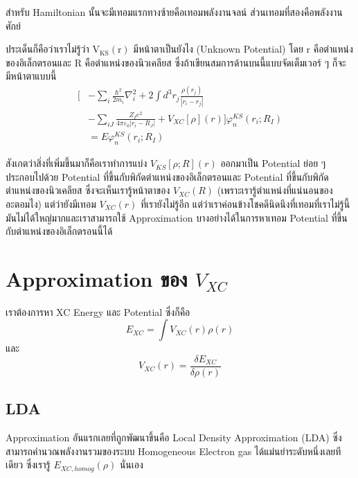 สำหรับ Hamiltonian นั้นจะมีเทอมแรกทางซ้ายคือเทอมพลังงานจลน์ ส่วนเทอมที่สองคือพลังงานศักย์

ประเด็นก็คือว่าเราไม่รู้ว่า $\mathrm{V}_{\mathrm{KS}}(\mathrm{r})$ มีหน้าตาเป็นยังไง (Unknown Potential) โดย $\mathrm{r}$ คือตำแหน่งของอิเล็กตรอนและ $\mathrm{R}$ คือตำแหน่งของนิวเคลียส ซึ่งถ้าเขียนสมการด้านบนนี้แบบจัดเต็มเวอร์ ๆ ก็จะมีหน้าตาแบบนี้
%
\begin{align}
    \biggl[ & -\sum_i \frac{\hbar^2}{2 m_i} \nabla_i^2+2 \int d^3 r_j
        \frac{\rho\left(r_j\right)}{\left|r_i-r_j\right|} \nonumber \\
        & -\sum_{i J} \frac{Z_I e^2}{4 \pi \varepsilon_0\left|r_i-R_J\right|}  
        + V_{X C}[\rho](r) \biggr] \varphi_n^{K S}\left(r_i ; R_I\right) \nonumber \\
    & = E \varphi_n^{K S}\left(r_i ; R_I\right)
\end{align}

สังเกตว่าสิ่งที่เพิ่มขึ้นมาก็คือเราทำการแบ่ง $V_{K S}[\rho ; R](r)$ ออกมาเป็น Potential ย่อย ๆ ประกอบไปด้วย Potential ที่ขึ้นกับพิกัดตำแหน่งของอิเล็กตรอนและ Potential ที่ขึ้นกับพิกัดตำแหน่งของนิวเคลียส ซึ่งจะเห็นเรารู้หน้าตาของ $V_{X C}(R)$ (เพราะเรารู้ตำแหน่งที่แน่นอนของอะตอมไง) แต่ว่ายังมีเทอม $V_{X C}(r)$ ที่เรายังไม่รู้อีก แต่ว่าเราค่อนข้างโชคดีนิดนึงที่เทอมที่เราไม่รู้นี้มันไม่ได้ใหญ่มากและเราสามารถใช้ Approximation บางอย่างได้ในการหาเทอม Potential ที่ขึ้นกับตำแหน่งของอิเล็กตรอนนี้ได้

\section{Approximation ของ $V_{X C}$}

เราต้องการหา XC Energy และ Potential ซึ่งก็คือ
%
\begin{equation}
    E_{XC} = \int V_{X C}(r) \rho(r)
\end{equation}
%
\noindent และ
%
\begin{equation}
    V_{X C}(r) = \frac{\delta E_{X C}}{\delta \rho(r)}
\end{equation}

\subsection{LDA}

Approximation อันแรกเลยที่ถูกพัฒนาขึ้นคือ Local Density Approximation (LDA) ซึ่งสามารถคำนวณพลังงานรวมของระบบ Homogeneous Electron gas ได้แม่นยำระดับหนึ่งเลยทีเดียว ซึ่งเรารู้ $E_{XC, homog}(\rho)$ นั่นเอง

